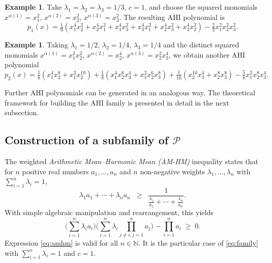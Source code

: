\documentclass[12pt]{elsarticle}
\theoremstyle{definition}
\newtheorem{example}[theorem]{Example}
\begin{document}
\begin{example}\label{ex:ahi1}
Take $\lambda_1=\lambda_2=\lambda_3=1/3$, $c=1$, and choose the squared monomials $x^{\alpha(1)}=x_1^2$, $x^{\alpha(2)}=x_2^2$, $x^{\alpha(3)}=x_3^2$. The resulting AHI polynomial is
\begin{equation}\label{eq:ahi-ex1}
    p_1(x) = \tfrac{1}{9}(x_1^4 x_2^2 + x_2^4 x_1^2 + x_1^4 x_3^2 + x_3^4 x_1^2 + x_2^4 x_3^2 + x_3^4 x_2^2) - \tfrac{2}{3}x_1^2x_2^2x_3^2.
\end{equation}
\end{example}

\begin{example}\label{ex:ahi2}
Taking $\lambda_1=1/2$, $\lambda_2=1/4$, $\lambda_3=1/4$ and the distinct squared monomials $x^{\alpha(1)}=x_1^2 x_2^2$, $x^{\alpha(2)}=x_2^4$, $x^{\alpha(3)}=x_2^2 x_3^4$, we obtain another AHI polynomial
\begin{equation}\label{eq:ahi-ex2}
    p_2(x) = \tfrac{1}{8}(x_1^4 x_2^8 + x_1^2 x_2^{10}) + \tfrac{1}{8}(x_1^4 x_2^6 x_3^4 + x_1^2 x_2^6 x_3^8) + \tfrac{1}{16}(x_2^{10} x_3^4 + x_2^8 x_3^8) - \tfrac{5}{8} x_1^2 x_2^8 x_3^4.
\end{equation}
\end{example}

Further AHI polynomials can be generated in an analogous way. The theoretical framework for building the AHI family is presented in detail in the next subsection.

\subsection{Construction of a subfamily of $\mathcal{P}$}\label{subsec:construction}

The weighted \emph{Arithmetic Mean--Harmonic Mean (AM-HM)} inequality states that for $n$ positive real numbers $a_1,\dots,a_n$ and $n$ non-negative weights $\lambda_1,\dots,\lambda_n$ with $\sum_{i=1}^n \lambda_i = 1$,
\[
  \lambda_1 a_1 + \cdots + \lambda_n a_n
  \;\;\ge\;\;
  \frac{1}{\frac{\lambda_1}{a_1} + \cdots + \frac{\lambda_n}{a_n}}.
\]
With simple algebraic manipulation and rearrangement, this yields
\begin{equation}\label{eq:amhm}
\Big(\sum_{i=1}^n \lambda_i a_i\Big) \Big(\sum_{i=1}^n \lambda_i \prod_{{j\neq i}, j=1}^n a_j\Big) - \prod_{i=1}^n a_i \;\geq\; 0 .
\end{equation}
Expression \eqref{eq:amhm} is valid for all $n \in \mathbb{N}$. It is the particular case of \eqref{eq:family} with $\sum_{i=1}^n \lambda_i = 1$ and $c=1$.
\end{document}
